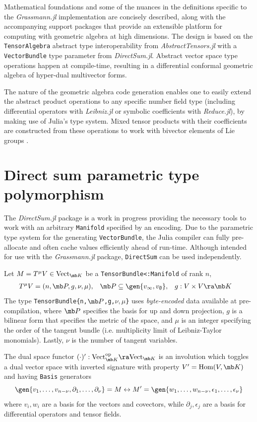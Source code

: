 \documentclass{juliacon}
\begin{document}
Mathematical foundations and some of the nuances in the definitions specific to the \textit{Grassmann.jl} implementation are concisely described, along with the accompanying support packages that provide an extensible platform for computing with geometric algebra at high dimensions.
The design is based on the \verb`TensorAlgebra` abstract type interoperability from \textit{AbstractTensors.jl} with a \verb`VectorBundle` type parameter from \textit{DirectSum.jl}. Abstract vector space type operations happen at compile-time, resulting in a differential conformal geometric algebra of hyper-dual multivector forms.

The nature of the geometric algebra code generation enables one to easily extend the abstract product operations to any specific number field type (including differential operators with \textit{Leibniz.jl} or symbolic coefficients with \textit{Reduce.jl}), by making use of Julia's type system. Mixed tensor products with their coefficients are constructed from these operations to work with bivector elements of Lie groups \cite{hestenes}\cite{shahshahani}.

\section{Direct sum parametric type polymorphism}

The \textit{DirectSum.jl} package is a work in progress providing the necessary tools to work with an arbitrary \verb`Manifold` specified by an encoding. Due to the parametric type system for the generating \verb`VectorBundle`, the Julia compiler can fully pre-allocate and often cache values efficiently ahead of run-time.
Although intended for use with the \textit{Grassmann.jl} package, \verb`DirectSum` can be used independently.

\begin{definition}
	Let $M = T^\mu V\in\text{Vect}_{\mb K}$ be a \verb`TensorBundle<:Manifold` of rank $n$,
	\begin{align*}
		T^\mu V &= (n,\mb P,g,\nu,\mu), & \mb P &\subseteq\gen{v_\infty,v_\emptyset}, & g &:V\times V\ra\mb K
	\end{align*}
	The type \verb+TensorBundle{n,+$\mb P$\verb+,g,+$\nu,\mu$\verb+}+ uses \textit{byte-encoded} data available at pre-compilation, where
	$\mb P$ specifies the basis for up and down projection,
	$g$ is a bilinear form that specifies the metric of the space,
	and $\mu$ is an integer specifying the order of the tangent bundle (i.e. multiplicity limit of Leibniz-Taylor monomials). Lastly, $\nu$ is the number of tangent variables.
\end{definition}
The dual space functor $(\cdot)':\text{Vect}_{\mb K}^\text{op}\ra\text{Vect}_{\mb K}$
is an involution which toggles a dual vector space with inverted signature with property $V' = \text{Hom}(V,\mb K)$ and having \verb`Basis` generators
$$\gen{v_1,\dots,v_{n-\nu},\partial_1,\dots,\partial_\nu}=M\leftrightarrow M' = \gen{w_1,\dots,w_{n-\nu},\epsilon_1,\dots,\epsilon_\nu}$$
where $v_i,w_i$ are a basis for the vectors and covectors, while $\partial_j,\epsilon_j$ are a basis for differential operators and tensor fields.
\end{document}
